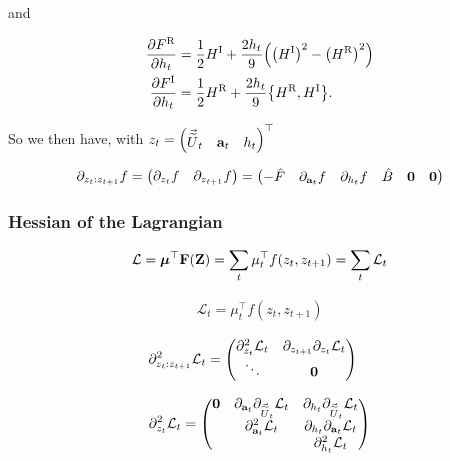 \documentclass{article}
\newcommand{\isovecU}{\vec{\widetilde{U}}}
\newcommand{\HI}{H^{\text{I}}}
\newcommand{\HR}{H^{\text{R}}}
\newcommand{\FR}{F^{\text{R}}}
\newcommand{\FI}{F^{\text{I}}}
\begin{document}
and

\begin{align*}
  \pdv{\FR}{h_t} &= \frac{1}{2} \HI + \frac{2h_t}{9} \qty(\qty(\HI)^2 - \qty(\HR)^2) \\
  \pdv{\FI}{h_t} &= \frac{1}{2} \HR + \frac{2h_t}{9} \qty{\HR,\HI}.
\end{align*}

So we then have, with $z_t = \mqty(\isovecU_t & \vb{a}_t & h_t)^\top$

\begin{equation*}
  \partial_{z_t:z_{t+1}} f = \mqty(\partial_{z_t}f & \partial_{z_{t+1}}f) = \mqty(-\hat F & \partial_{\vb{a}_t}f & \partial_{h_t} f & \hat B & \vb{0} & \vb{0} )
\end{equation*}

\subsubsection*{Hessian of the Lagrangian}

\begin{align*}
  \mathcal{L} = \vb*{\mu}^\top \vb{F}(\vb{Z}) = \sum_t \mu_t^\top f(z_t, z_{t+1}) = \sum_t \mathcal{L}_t
\end{align*}

\begin{align*}
  \mathcal{L}_t = \mu_t^\top f(z_t, z_{t+1})
\end{align*}

\begin{align*}
  \partial^2_{z_t:z_{t+1}} \mathcal{L}_t 
  &= \mqty(
    \partial^2_{z_t} \mathcal{L}_t & \partial_{z_{t+1}} \partial_{z_t} \mathcal{L}_t \\
    \ddots & \vb{0}
  )
\end{align*}


\begin{align*}
  \partial^2_{z_t} \mathcal{L}_t = \mqty(
    \vb{0} & \partial_{\vb{a}_t} \partial_{\isovecU_t} \mathcal{L}_t & \partial_{h_t} \partial_{\isovecU_t} \mathcal{L}_t \\
    & \partial^2_{\vb{a}_t} \mathcal{L}_t & \partial_{h_t} \partial_{\vb{a}_t} \mathcal{L}_t \\
    & & \partial^2_{h_t} \mathcal{L}_t
  )
\end{align*}
\end{document}
